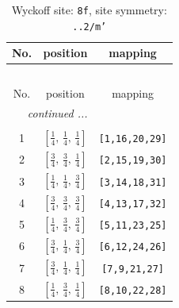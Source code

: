\documentclass[fleqn,8pt]{jsarticle}
\begin{document}
\begin{longtable}{ccc}
\caption{Wyckoff site: {\tt 8f}, site symmetry: {\tt ..2/m'}}
 \\
 \hline \hline
No. & position & mapping \\ \hline \endfirsthead

\multicolumn{2}{l}{\tablename\ \thetable{}} \\
 \hline \hline
No. & position & mapping \\ \hline \endhead

 \hline \hline
\multicolumn{2}{r}{\footnotesize\it continued ...} \\ \endfoot

 \hline \hline
\multicolumn{2}{r}{} \\ \endlastfoot

1 & $\left[ \frac{1}{4},\, \frac{1}{4},\, \frac{1}{4} \right]$ & {\tt [1,16,20,29]} \\ \hline
2 & $\left[ \frac{3}{4},\, \frac{3}{4},\, \frac{1}{4} \right]$ & {\tt [2,15,19,30]} \\ \hline
3 & $\left[ \frac{1}{4},\, \frac{1}{4},\, \frac{3}{4} \right]$ & {\tt [3,14,18,31]} \\ \hline
4 & $\left[ \frac{3}{4},\, \frac{3}{4},\, \frac{3}{4} \right]$ & {\tt [4,13,17,32]} \\ \hline
5 & $\left[ \frac{1}{4},\, \frac{3}{4},\, \frac{3}{4} \right]$ & {\tt [5,11,23,25]} \\ \hline
6 & $\left[ \frac{3}{4},\, \frac{1}{4},\, \frac{3}{4} \right]$ & {\tt [6,12,24,26]} \\ \hline
7 & $\left[ \frac{3}{4},\, \frac{1}{4},\, \frac{1}{4} \right]$ & {\tt [7,9,21,27]} \\ \hline
8 & $\left[ \frac{1}{4},\, \frac{3}{4},\, \frac{1}{4} \right]$ & {\tt [8,10,22,28]} \\
\end{longtable}
\renewcommand{\arraystretch}{1.2}
\end{document}
